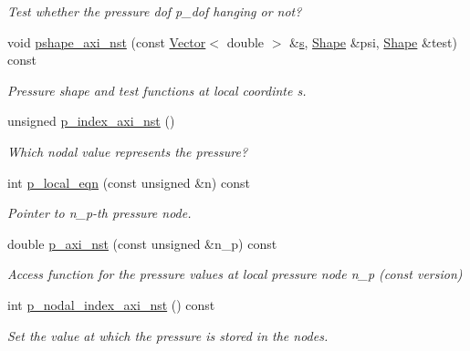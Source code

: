 \begin{DoxyCompactItemize}
\begin{DoxyCompactList}\small\item\em Test whether the pressure dof p\+\_\+dof hanging or not? \end{DoxyCompactList}\item 
void \hyperlink{classoomph_1_1GeneralisedNewtonianAxisymmetricTTaylorHoodElement_aa94bc4ba026490b08ff70059c2362a2b}{pshape\+\_\+axi\+\_\+nst} (const \hyperlink{classoomph_1_1Vector}{Vector}$<$ double $>$ \&\hyperlink{cfortran_8h_ab7123126e4885ef647dd9c6e3807a21c}{s}, \hyperlink{classoomph_1_1Shape}{Shape} \&psi, \hyperlink{classoomph_1_1Shape}{Shape} \&test) const
\begin{DoxyCompactList}\small\item\em Pressure shape and test functions at local coordinte s. \end{DoxyCompactList}\item 
unsigned \hyperlink{classoomph_1_1GeneralisedNewtonianAxisymmetricTTaylorHoodElement_a8821cb68c2c1ca1999ef3ce023c57148}{p\+\_\+index\+\_\+axi\+\_\+nst} ()
\begin{DoxyCompactList}\small\item\em Which nodal value represents the pressure? \end{DoxyCompactList}\item 
int \hyperlink{classoomph_1_1GeneralisedNewtonianAxisymmetricTTaylorHoodElement_adab05003b0136131aa4ca7bcafd32c02}{p\+\_\+local\+\_\+eqn} (const unsigned \&n) const
\begin{DoxyCompactList}\small\item\em Pointer to n\+\_\+p-\/th pressure node. \end{DoxyCompactList}\item 
double \hyperlink{classoomph_1_1GeneralisedNewtonianAxisymmetricTTaylorHoodElement_a7567af3eef0ad8287999ba22ccd46892}{p\+\_\+axi\+\_\+nst} (const unsigned \&n\+\_\+p) const
\begin{DoxyCompactList}\small\item\em Access function for the pressure values at local pressure node n\+\_\+p (const version) \end{DoxyCompactList}\item 
int \hyperlink{classoomph_1_1GeneralisedNewtonianAxisymmetricTTaylorHoodElement_a5be1c1c8da5bffcaeedb416349df36d7}{p\+\_\+nodal\+\_\+index\+\_\+axi\+\_\+nst} () const
\begin{DoxyCompactList}\small\item\em Set the value at which the pressure is stored in the nodes. \end{DoxyCompactList}\item 

\end{DoxyCompactItemize}
